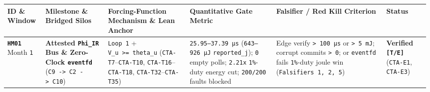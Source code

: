\documentclass[10pt,letterpaper]{article}
\begin{document}
{\scriptsize\setlength{\tabcolsep}{3.0pt}\renewcommand{\arraystretch}{1.14}
\begin{longtable}[]{@{}
  >{\raggedright\arraybackslash}p{}
  >{\raggedright\arraybackslash}p{}
  >{\raggedright\arraybackslash}p{}
  >{\raggedright\arraybackslash}p{}
  >{\raggedright\arraybackslash}p{}
  >{\raggedright\arraybackslash}p{}@{}}
\toprule\noalign{}
\begin{minipage}[b]{\linewidth}\raggedright
\textbf{ID \& Window}
\end{minipage} & \begin{minipage}[b]{\linewidth}\raggedright
\textbf{Milestone \& Bridged Silos}
\end{minipage} & \begin{minipage}[b]{\linewidth}\raggedright
\textbf{Forcing-Function Mechanism \& Lean Anchor}
\end{minipage} & \begin{minipage}[b]{\linewidth}\raggedright
\textbf{Quantitative Gate Metric}
\end{minipage} & \begin{minipage}[b]{\linewidth}\raggedright
\textbf{Falsifier / Red Kill Criterion}
\end{minipage} & \begin{minipage}[b]{\linewidth}\raggedright
\textbf{Status}
\end{minipage} \\
\midrule\noalign{}
\endhead
\bottomrule\noalign{}
\endlastfoot
\textbf{\texttt{HM01}} Month \texttt{1} & \textbf{Attested
\texttt{Phi\_IR} Bus \& Zero-Clock \texttt{eventfd}}
(\texttt{C9\ -\textgreater{}\ C2\ -\textgreater{}\ C10}) &
\texttt{Loop\ 1} + \texttt{V\_u\ \textgreater{}=\ theta\_u}
(\texttt{CTA-T7}--\texttt{CTA-T10}, \texttt{CTA-T16}--\texttt{CTA-T18},
\texttt{CTA-T32}--\texttt{CTA-T35}) & \texttt{25.\allowbreak{}95–37.\allowbreak{}39\ µs}
(\texttt{643–926\ µJ} \texttt{reported\_\allowbreak{}j}); \texttt{0} empty polls;
\texttt{2.21x} \texttt{1\%}-duty energy cut; \texttt{200/200} faults
blocked & Edge verify \texttt{\textgreater{}\ 100\ µs} or
\texttt{\textgreater{}\ 5\ mJ}; corrupt commits
\texttt{\textgreater{}\ 0}; or \texttt{eventfd} fails \texttt{1\%}-duty
joule win (\texttt{Falsifiers\ 1,\allowbreak{}\ 2,\allowbreak{}\ 5}) & \textbf{Verified
\texttt{{[}T/E{]}}} (\texttt{CTA-E1}, \texttt{CTA-E3}) \\

\end{longtable}}
\end{document}
